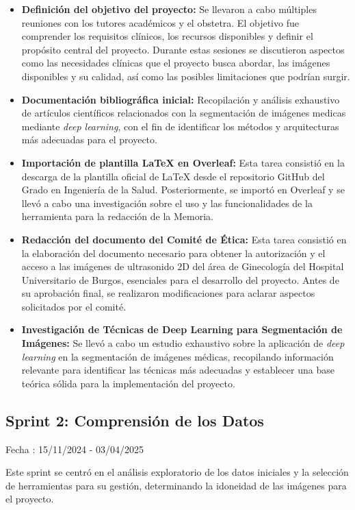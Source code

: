 \begin{itemize}
    \item \textbf{Definición del objetivo del proyecto:} Se llevaron a cabo múltiples reuniones con los tutores académicos y el obstetra. El objetivo fue comprender los requisitos clínicos, los recursos disponibles y definir el propósito central del proyecto. Durante estas sesiones se discutieron aspectos como las necesidades clínicas que el proyecto busca  abordar, las imágenes disponibles y su calidad, así como las posibles limitaciones que podrían surgir.
    \item \textbf{Documentación bibliográfica inicial:} Recopilación y análisis exhaustivo de artículos científicos relacionados con la segmentación de imágenes medicas mediante \textit{deep learning}, con el fin de identificar los métodos y arquitecturas más adecuadas para el proyecto.
    \item \textbf{Importación de plantilla LaTeX en Overleaf:} Esta tarea consistió en la descarga de la plantilla oficial de LaTeX desde el repositorio GitHub del Grado en Ingeniería de la Salud. Posteriormente, se importó en Overleaf y se llevó a cabo una investigación sobre el uso y las funcionalidades de la herramienta para la redacción de la Memoria.
    \item \textbf{Redacción del documento del Comité de Ética:} Esta tarea consistió en la elaboración del documento necesario para obtener la autorización y el acceso a las imágenes de ultrasonido 2D del área de Ginecología del Hospital Universitario de Burgos, esenciales para el desarrollo del proyecto. Antes de su aprobación final, se realizaron modificaciones para aclarar aspectos solicitados por el comité. 
    \item \textbf{Investigación de Técnicas de Deep Learning para Segmentación de Imágenes:} Se llevó a cabo un estudio exhaustivo sobre la aplicación de \textit{deep learning} en la segmentación de imágenes médicas, recopilando información relevante para identificar las técnicas más adecuadas y establecer una base teórica sólida para la implementación del proyecto.
\end{itemize}

\subsection{Sprint 2: Comprensión de los Datos}

Fecha : 15/11/2024 - 03/04/2025

Este sprint se centró en el análisis exploratorio de los datos iniciales y la selección de herramientas para su gestión, determinando la idoneidad de las imágenes para el proyecto.

